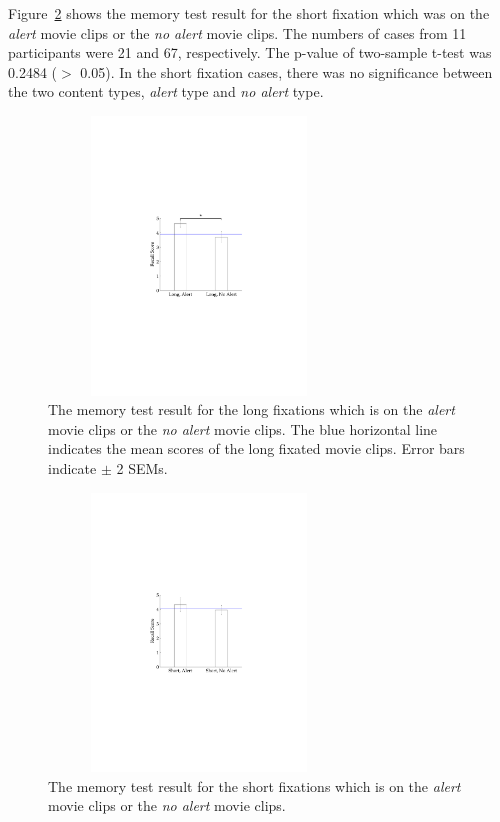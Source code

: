 \documentclass[10pt,letterpaper]{article}
\begin{document}
Figure~\ref{fig:memtest-short} shows the memory test result for the short fixation which was on the \textit{alert} movie clips or the \textit{no alert} movie clips. The numbers of cases from 11 participants were 21 and 67, respectively. The p-value of two-sample t-test was 0.2484 ($>$ 0.05). In the short fixation cases, there was no significance between the two content types, \textit{alert} type and \textit{no alert} type.

\begin{figure}
  \centerline{\includegraphics[width=80mm,height=74mm,trim=54mm 90mm 54mm 90mm]{./eps/memtest_long.pdf}}
  \caption[The memory test result for the long fixations which are on alert movie clips or no alert movie clips]{The memory test result for the long fixations which is on the \textit{alert} movie clips or the \textit{no alert} movie clips. The blue horizontal line indicates the mean scores of the long fixated movie clips. Error bars indicate $\pm$ 2 SEMs.}
  \label{fig:memtest-long}
\end{figure}

\begin{figure}
  \centerline{\includegraphics[width=80mm,height=74mm,trim=54mm 90mm 54mm 90mm]{./eps/memtest_short.pdf}}
  \caption[The memory test result for the short fixations which are on the alert movie clips or no alert movie clips]{The memory test result for the short fixations which is on the \textit{alert} movie clips or the \textit{no alert} movie clips.}
  \label{fig:memtest-short}
\end{figure}
\end{document}
